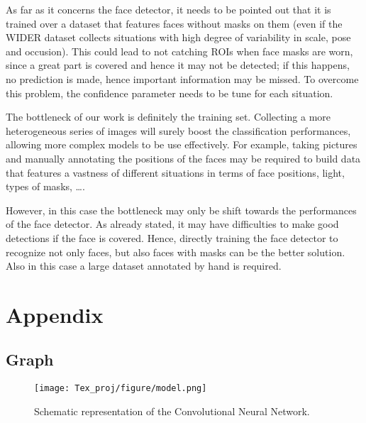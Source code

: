 \documentclass[10pt,twocolumn,letterpaper]{article}
\begin{document}
As far as it concerns the face detector, it needs to be pointed out that it is trained over a dataset that features faces without masks on them (even if the WIDER dataset collects situations with high degree of variability in scale, pose and occusion). This could lead to not catching ROIs when face masks are worn, since a great part is covered and hence it may not be detected; if this happens, no prediction is made, hence important information may be missed. To overcome this problem, the confidence parameter needs to be tune for each situation.

The bottleneck of our work is definitely the training set. Collecting a more heterogeneous series of images will surely boost the classification performances, allowing more complex models to be use effectively. For example, taking pictures and manually annotating the positions of the faces may be required to build data that features a vastness of different situations in terms of face positions, light, types of masks, \dots . 

However, in this case the bottleneck may only be shift towards the performances of the face detector. As already stated, it may have difficulties to make good detections if the face is covered. Hence, directly training the face detector to recognize not only faces, but also faces with masks can be the better solution. Also in this case a large dataset annotated by hand is required.

\section{Appendix}
\subsection{Graph}
\label{Grafo}
\begin{figure}[htp]
    \centering
    \texttt{[image: Tex\_proj/figure/model.png]}
    \caption{Schematic representation of the Convolutional Neural Network.}
    \label{fig:grafo}
\end{figure}

\newpage

{\small


}
\end{document}
